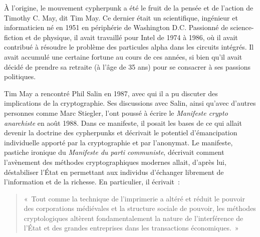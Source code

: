 À l'origine, le mouvement cypherpunk a été le fruit de la pensée et de l'action de Timothy C. May, dit Tim May. Ce dernier était un scientifique, ingénieur et informaticien né en 1951 en périphérie de Washington D.C. Passionné de science-fiction et de physique, il avait travaillé pour Intel de 1974 à 1986, où il avait contribué à résoudre le problème des particules alpha dans les circuits intégrés. Il avait accumulé une certaine fortune au cours de ces années, si bien qu'il avait décidé de prendre sa retraite (à l'âge de 35 ans) pour se consacrer à ses passions politiques.

Tim May a rencontré Phil Salin en 1987, avec qui il a pu discuter des implications de la cryptographie. Ses discussions avec Salin, ainsi qu'avec d'autres personnes comme Marc Stiegler, l'ont poussé à écrire le \emph{Manifeste crypto anarchiste} en août 1988. Dans ce manifeste, il posait les bases de ce qui allait devenir la doctrine des cypherpunks et décrivait le potentiel d'émancipation individuelle apporté par la cryptographie et par l'anonymat. Le manifeste, pastiche ironique du \emph{Manifeste du parti communiste}, décrivait comment l'avènement des méthodes cryptographiques modernes allait, d'après lui, déstabiliser l'État en permettant aux individus d'échanger librement de l'information et de la richesse. En particulier, il écrivait~: %

\begin{quote}
«~Tout comme la technique de l'imprimerie a altéré et réduit le pouvoir des corporations médiévales et la structure sociale de pouvoir, les méthodes cryptologiques altèrent fondamentalement la nature de l'interférence de l'État et des grandes entreprises dans les transactions économiques.~»
\end{quote} %

